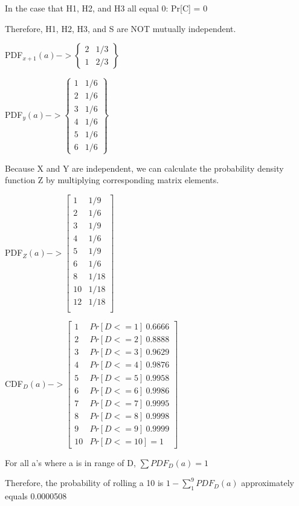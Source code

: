 \documentclass{6042}
\begin{document}
In the case that H1, H2, and H3 all equal 0: Pr[C] = 0

Therefore, H1, H2, H3, and S are NOT mutually independent.


PDF$_{x+1}(a) -> \begin{Bmatrix}
    2 & 1/3 \\
    1 & 2/3
\end{Bmatrix}$

PDF$_{y}(a) -> \begin{Bmatrix}
    1 & 1/6 \\
    2 & 1/6 \\
    3 & 1/6 \\
    4 & 1/6 \\
    5 & 1/6 \\
    6 & 1/6
\end{Bmatrix}$

Because X and Y are independent, we can calculate the probability density function Z by multiplying
corresponding matrix elements.

PDF$_{Z}(a) -> \begin{bmatrix}
    1 & 1/9 \\
    2 & 1/6 \\
    3 & 1/9 \\
    4 & 1/6 \\
    5 & 1/9 \\
    6 & 1/6 \\
    8 & 1/18 \\
    10 & 1/18 \\
    12 & 1/18 \\
\end{bmatrix}$

CDF$_{D}(a) -> \begin{bmatrix}
    1 & Pr[D <= 1] ~ 0.6666 \\
    2 & Pr[D <= 2] ~ 0.8888 \\
    3 & Pr[D <= 3] ~ 0.9629 \\
    4 & Pr[D <= 4] ~ 0.9876 \\
    5 & Pr[D <= 5] ~ 0.9958 \\
    6 & Pr[D <= 6] ~ 0.9986 \\
    7 & Pr[D <= 7] ~ 0.9995 \\
    8 & Pr[D <= 8] ~ 0.9998 \\
    9 & Pr[D <= 9] ~ 0.9999 \\
    10 & Pr[D <= 10] = 1
\end{bmatrix}$

For all a's where a is in range of D, $\sum{PDF_{D}(a)} = 1$

Therefore, the probability of rolling a 10 is $1 - \sum_{1}^{9} PDF_{D}(a)$ approximately equals 0.0000508









\end{document}

